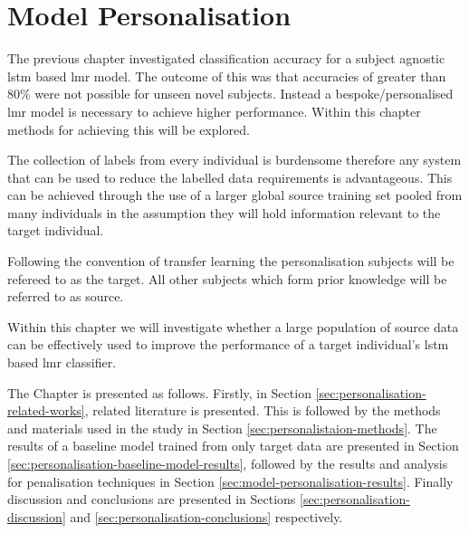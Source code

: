 \chapter{Model Personalisation}
\label{chp:personalisation}

The previous chapter investigated classification accuracy for a subject agnostic \acrshort{lstm} based \acrshort{lmr} model. The outcome of this was that accuracies of greater than 80\% were not possible for unseen novel subjects. Instead a bespoke/personalised \acrshort{lmr} model is necessary to achieve higher performance. Within this chapter methods for achieving this will be explored.

The collection of labels from every individual is burdensome therefore any system that can be used to reduce the labelled data requirements is advantageous. This can be achieved through the use of a larger global source training set pooled from many individuals in the assumption they will hold information relevant to the target individual.\cite{Fallahzadeh2017, Schneider2021} 

Following the convention of transfer learning the personalisation subjects will be refereed to as the target. All other subjects which form prior knowledge will be referred to as source.

Within this chapter we will investigate whether a large population of source data can be effectively used to improve the performance of a target individual's \acrshort{lstm} based \acrshort{lmr} classifier.

The Chapter is presented as follows. Firstly, in Section \ref{sec:personalisation-related-works}, related literature is presented. This is followed by the methods and materials used in the study in Section \ref{sec:personalistaion-methods}. The results of a baseline model trained from only target data are presented in Section \ref{sec:personalisation-baseline-model-results}, followed by the results and analysis for penalisation techniques in Section \ref{sec:model-personalisation-results}.  Finally discussion and conclusions are presented in Sections \ref{sec:personalisation-discussion} and \ref{sec:personalisation-conclusions} respectively.


